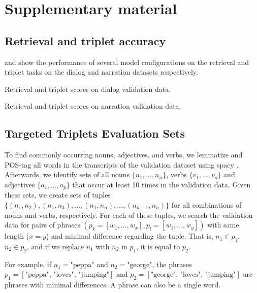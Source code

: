 \appendix

\section{Supplementary material}

\subsection{Retrieval and triplet accuracy}
 and  show
the performance of several model configurations on the retrieval and
triplet tasks on the dialog and narration datasets respectively.
 \begin{table}[htb]
   \centering
   
   \caption{Retrieval and triplet scores on dialog validation data.}
   \label{tab:scores-dialog}
 \end{table}

\begin{table}[htb]
   \centering
   
   \caption{Retrieval and triplet scores on narration validation data.}
   \label{tab:scores-narration}
 \end{table}

\subsection{Targeted Triplets Evaluation Sets}\label{app:targeted_triplets_eval}

To find commonly occurring nouns, adjectives, and verbs, we lemmatize and POS-tag all words in the transcripts of the validation dataset using spacy \citep{honnibal2020spacy}. Afterwards, we identify sets of all nouns $\{n_1, ..., n_n\}$, verbs $\{v_1, ..., v_o\}$ and adjectives $\{a_1, ..., a_p\}$ that occur at least 10 times in the validation data. Given these sets, we create sets of tuples $\{(n_1, n_2), (n_1, n_3), ..., (n_1, n_n), ...,  (n_{n-1}, n_n)\}$ for all combinations of nouns and verbs, respectively. For each of these tuples, we search the validation data for pairs of phrases $(p_k=[w_1, ..., w_x], p_l=[w_1, ..., w_y])$ with same length ($x=y$) and minimal difference regarding the tuple. That is, $n_1 \in p_1$, $n_2 \in p_2$, and if we replace $n_1$ with $n_2$ in $p_1$, it is equal to $p_2$. 

For example, if $n_1 = \text{"peppa"}$ and $n_2 = \text{"george"}$, the phrases $p_1 = [\text{"peppa", "loves", "jumping"}]$ and $p_2 = [\text{"george", "loves", "jumping"}]$ are phrases with minimal differences. A phrase can also be a single word.

